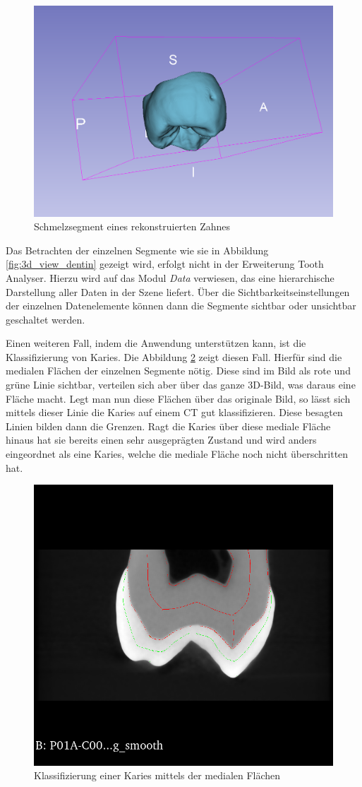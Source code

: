 \begin{figure}[h]
\begin{minipage}[b]{0.32\textwidth}
		\includegraphics[width=\textwidth]{img/3dViewEnamel.png}
		\caption{Schmelzsegment eines rekonstruierten Zahnes}
		\label{fig:3d_view_schmelz}
	\end{minipage}
\end{figure}

Das Betrachten der einzelnen Segmente wie sie in Abbildung
\ref{fig:3d_view_dentin} gezeigt wird, erfolgt nicht in der Erweiterung Tooth Analyser.
Hierzu wird auf das Modul \textit{Data} verwiesen, das eine hierarchische
Darstellung aller Daten in der Szene liefert. Über die Sichtbarkeitseinstellungen
der einzelnen Datenelemente können dann die Segmente sichtbar oder unsichtbar geschaltet
werden.

Einen weiteren Fall, indem die Anwendung unterstützen kann, ist die Klassifizierung
von Karies. Die Abbildung \ref{fig:classification} zeigt diesen Fall. Hierfür sind
die medialen Flächen der einzelnen Segmente nötig. Diese sind im Bild als rote
und grüne Linie sichtbar, verteilen sich aber über das ganze \ac{3D}-Bild, was daraus
eine Fläche macht. Legt man nun diese Flächen über das originale Bild, so lässt sich
mittels dieser Linie die Karies auf einem \ac{CT} gut klassifizieren. Diese besagten
Linien bilden dann die Grenzen. Ragt die Karies über diese mediale Fläche hinaus
hat sie bereits einen sehr ausgeprägten Zustand und wird anders eingeordnet als
eine Karies, welche die mediale Fläche noch nicht überschritten hat.

\begin{figure}[h]
	\centering
	\includegraphics[width=0.3 \textwidth]{img/classification.png}
	\caption{Klassifizierung einer Karies mittels der medialen Flächen}
	\label{fig:classification}
\end{figure}

